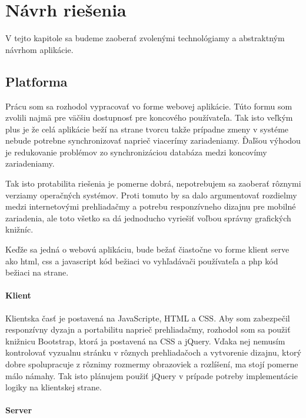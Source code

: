 \newpage

\section{Návrh riešenia}

V tejto kapitole sa budeme zaoberať zvolenými technológiamy a abstraktným návrhom 
aplikácie.

\subsection{Platforma}

Prácu som sa rozhodol vypracovať vo forme webovej aplikácie.
Túto formu som zvolili najmä pre väčšiu dostupnosť pre koncového používateľa.
Tak isto veľkým plus je že celá aplikácie beží na strane tvorcu takže prípadne zmeny 
v systéme nebude potrebne synchronizovať naprieč viacerímy zariadeniamy. 
Ďaľšou výhodou je redukovanie problémov zo synchronizáciou databáza medzi koncovímy 
zariadeniamy.

Tak isto protabilita riešenia je pomerne dobrá, nepotrebujem sa zaoberať rôznymi verziamy
operačných systémov. Proti tomuto by sa dalo argumentovať rozdielmy medzi 
internetovými prehliadačmy a potrebu responzívneho dizajnu pre mobilné zariadenia,
ale toto všetko sa dá jednoducho vyriešiť voľbou správny grafických knižníc.

Keďže sa jedná o webovú aplikáciu, bude bežať čiastočne vo forme klient serve ako 
html, css a javascript kód bežiaci vo vyhľadávači používateľa a php kód bežiaci na strane.

\paragraph{Klient}

Klientska časť je postavená na JavaScripte, HTML a CSS. Aby som zabezpečil responzívny 
dyzajn a portabilitu naprieč prehliadačmy, rozhodol som sa použiť knižnicu Bootstrap,
ktorá ja postavená na CSS a jQuery. Vďaka nej nemusím kontrolovať vyzualnu stránku v 
rôznych prehliadačoch a vytvorenie dizajnu, ktorý dobre spolupracuje z rôznimy rozmermy
obrazoviek a rozlíšení, ma stojí pomerne málo námahy. Tak isto plánujem použiť 
jQuery v prípade potreby implementácie logiky na klientskej strane.

\paragraph{Server}

